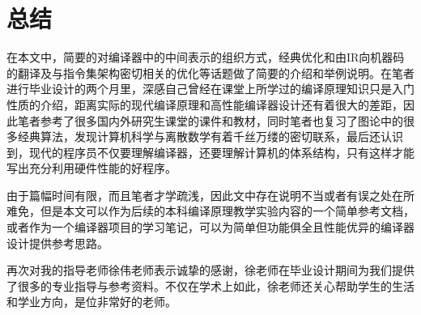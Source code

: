\chapter{总结}

在本文中，简要的对编译器中的中间表示的组织方式，经典优化和由IR向机器码的翻译及与指令集架构密切相关的优化等话题做了简要的介绍和举例说明。在笔者进行毕业设计的两个月里，深感自己曾经在课堂上所学过的编译原理知识只是入门性质的介绍，距离实际的现代编译原理和高性能编译器设计还有着很大的差距，因此笔者参考了很多国内外研究生课堂的课件和教材，同时笔者也复习了图论中的很多经典算法，发现计算机科学与离散数学有着千丝万缕的密切联系，最后还认识到，现代的程序员不仅要理解编译器，还要理解计算机的体系结构，只有这样才能写出充分利用硬件性能的好程序。

由于篇幅时间有限，而且笔者才学疏浅，因此文中存在说明不当或者有误之处在所难免，但是本文可以作为后续的本科编译原理教学实验内容的一个简单参考文档，或者作为一个编译器项目的学习笔记，可以为简单但功能俱全且性能优异的编译器设计提供参考思路。

再次对我的指导老师徐伟老师表示诚挚的感谢，徐老师在毕业设计期间为我们提供了很多的专业指导与参考资料。不仅在学术上如此，徐老师还关心帮助学生的生活和学业方向，是位非常好的老师。